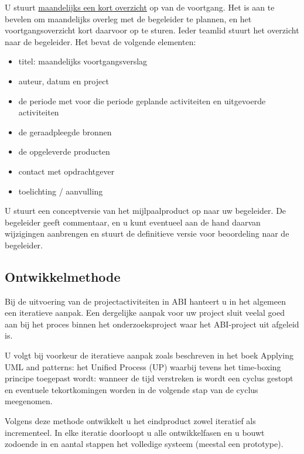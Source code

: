 U stuurt
\href{http://studienet.ou.nl/bbcswebdav/institution/INF/Cursus/T61327/Formulieren/T61327_Maandelijks_Voortgangsverslag_student.doc}{maandelijks een kort overzicht}
op van de voortgang. Het is aan te bevelen om maandelijks overleg met de begeleider te plannen, en het
voortgangsoverzicht kort daarvoor op te sturen. Ieder teamlid stuurt het overzicht naar de begeleider. Het bevat de volgende elementen:

{
\begin{itemize}
    \item titel: maandelijks voortgangsverslag
    \item auteur, datum en project
    \item de periode met voor die periode geplande activiteiten en uitgevoerde activiteiten
    \item de geraadpleegde bronnen
    \item de opgeleverde producten
    \item contact met opdrachtgever
    \item toelichting / aanvulling
\end{itemize}
}

U stuurt een conceptversie van het mijlpaalproduct op naar uw begeleider. De
begeleider geeft commentaar, en u kunt eventueel aan de hand daarvan wijzigingen
aanbrengen en stuurt de definitieve versie voor beoordeling naar de begeleider.

\subsection{Ontwikkelmethode}
    Bij de uitvoering van de projectactiviteiten in ABI hanteert u in het
algemeen een iteratieve aanpak. Een dergelijke aanpak voor uw project sluit
veelal goed aan bij het proces binnen het onderzoeksproject waar het ABI-project
uit afgeleid is.

    U volgt bij voorkeur de iteratieve aanpak zoals beschreven in het boek
Applying UML and patterns: het Unified Process (UP) waarbij tevens het
time-boxing principe toegepast wordt: wanneer de tijd verstreken is wordt een
cyclus gestopt en eventuele tekortkomingen worden in de volgende stap van de
cyclus meegenomen.

    Volgens deze methode ontwikkelt u het eindproduct zowel iteratief als
incrementeel. In elke iteratie doorloopt u alle ontwikkelfasen en u bouwt
zodoende in en aantal stappen het volledige systeem (meestal een prototype).

